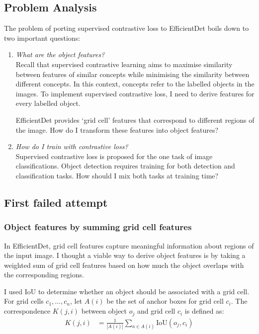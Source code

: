 \documentclass[12pt,a4paper,twoside,openright]{report}
\begin{document}
\subsection{Problem Analysis}
The problem of porting supervised contrastive loss to EfficientDet boils down to two important questions:
\begin{enumerate}
    \item \textit{What are the object features?}\\ 
    Recall that supervised contrastive learning aims to maximise similarity between features of similar concepts while minimising the similarity between different concepts. In this context, concepts refer to the labelled objects in the images. To implement supervised contrastive loss, I need to derive features for every labelled object.

    EfficientDet provides `grid cell' features that correspond to different regions of the image. How do I transform these features into object features?
    \item \textit{How do I train with contrastive loss?}\\
    Supervised contrastive loss \cite{khosla_supervised_2021} is proposed for the one task of image classifications. Object detection requires training for both detection and classification tasks. How should I mix both tasks at training time?
\end{enumerate}

\subsection{First failed attempt}
\subsubsection{Object features by summing grid cell features}
In EfficientDet, grid cell features capture meaningful information about regions of the input image. I thought a viable way to derive object features is by taking a weighted sum of grid cell features based on how much the object overlaps with the corresponding regions.

I used IoU to determine whether an object should be associated with a grid cell. For grid cells $c_1, \dots, c_n$, let $A(i)$ be the set of anchor boxes for grid cell $c_i$. The correspondence $K(j, i)$ between object $o_j$ and grid cell $c_i$ is defined as:
\begin{align}
    K(j, i) &= \frac{1}{|A(i)|}\sum\limits_{a\in A(i)} \text{IoU}(o_j, c_i)
\end{align}
\end{document}
